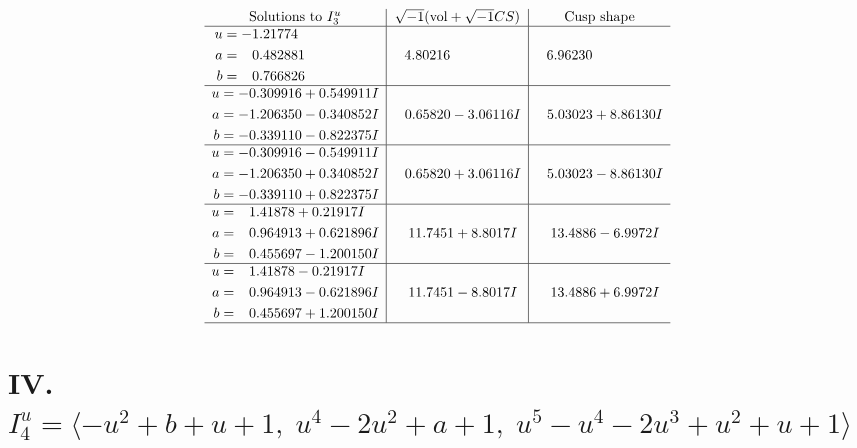 \documentclass[1p]{elsarticle_modified}
\theoremstyle{definition}
\newcommand{\I}{\sqrt{-1}}
\begin{document}
$$\begin{array}{c|c|c}  
\text{Solutions to }I^u_{3}& \I (\text{vol} + \sqrt{-1}CS) & \text{Cusp shape}\\
 \hline 
\begin{aligned}
u &= -1.21774\phantom{ +0.000000I} \\
a &= \phantom{-}0.482881\phantom{ +0.000000I} \\
b &= \phantom{-}0.766826\phantom{ +0.000000I}\end{aligned}
 & \phantom{-}4.80216\phantom{ +0.000000I} & \phantom{-}6.96230\phantom{ +0.000000I} \\ \hline\begin{aligned}
u &= -0.309916 + 0.549911 I \\
a &= -1.206350 - 0.340852 I \\
b &= -0.339110 - 0.822375 I\end{aligned}
 & \phantom{-}0.65820 - 3.06116 I & \phantom{-}5.03023 + 8.86130 I \\ \hline\begin{aligned}
u &= -0.309916 - 0.549911 I \\
a &= -1.206350 + 0.340852 I \\
b &= -0.339110 + 0.822375 I\end{aligned}
 & \phantom{-}0.65820 + 3.06116 I & \phantom{-}5.03023 - 8.86130 I \\ \hline\begin{aligned}
u &= \phantom{-}1.41878 + 0.21917 I \\
a &= \phantom{-}0.964913 + 0.621896 I \\
b &= \phantom{-}0.455697 - 1.200150 I\end{aligned}
 & \phantom{-}11.7451 + 8.8017 I & \phantom{-}13.4886 - 6.9972 I \\ \hline\begin{aligned}
u &= \phantom{-}1.41878 - 0.21917 I \\
a &= \phantom{-}0.964913 - 0.621896 I \\
b &= \phantom{-}0.455697 + 1.200150 I\end{aligned}
 & \phantom{-}11.7451 - 8.8017 I & \phantom{-}13.4886 + 6.9972 I\\
 \hline 
 \end{array}$$\newpage\newpage\renewcommand{\arraystretch}{1}
\centering \section*{IV. $I^u_{4}= \langle - u^2+b+u+1,\;u^4-2 u^2+a+1,\;u^5- u^4-2 u^3+u^2+u+1 \rangle$}
\end{document}
